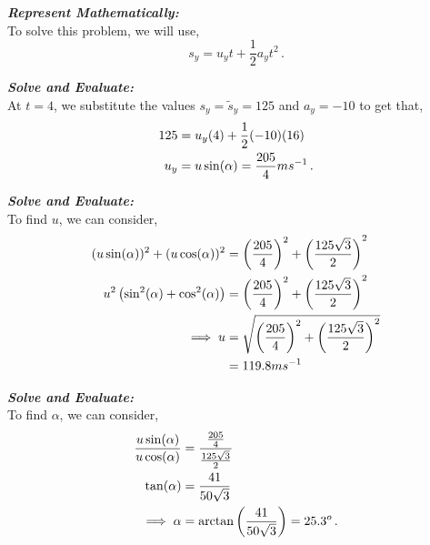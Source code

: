 \begin{subquestions}
\begin{subsubquestions}

\subsubquestion

\textbf{\textit{Represent Mathematically:}} \\
To solve this problem, we will use,
\begin{equation}
	s_y = u_yt + \frac{1}{2}a_yt^2 \,.
\end{equation}




\textbf{\textit{Solve and Evaluate:}} \\
At $t=4$, we substitute the values $s_y=\tilde{s}_y=125$ and $a_y=-10$ to get that,
\begin{align}
	125 & = u_y(4) + \frac{1}{2}(-10)(16) \nonumber \\
	u_y & = u\sin(\alpha) = \frac{205}{4}ms^{-1} \,.
\end{align}


\subsubquestion

\textbf{\textit{Solve and Evaluate:}} \\
To find $u$, we can consider,
\begin{align}
	(u\sin(\alpha))^2 + (u\cos(\alpha))^2 & = \left(\frac{205}{4}\right)^2 + \left(\frac{125\sqrt{3}}{2}\right)^2 \nonumber \\
	 u^2\left(\sin^2(\alpha)+\cos^2(\alpha)\right) & = \left(\frac{205}{4}\right)^2 + \left(\frac{125\sqrt{3}}{2}\right)^2 \nonumber \\
	 \implies u & = \sqrt{\left(\frac{205}{4}\right)^2 + \left(\frac{125\sqrt{3}}{2}\right)^2} \nonumber \\
	            & = 119.8ms^{-1}
\end{align}


\subsubquestion

\textbf{\textit{Solve and Evaluate:}} \\
To find $\alpha$, we can consider,
\begin{align}
	\frac{u\sin(\alpha)}{u\cos(\alpha)} & = \frac{\frac{205}{4}}{\frac{125\sqrt{3}}{2}} \nonumber \\
	\tan(\alpha) & = \frac{41}{50\sqrt{3}} \nonumber \\
	\implies \alpha & = \arctan\left(\frac{41}{50\sqrt{3}}\right) = 25.3^o \,.
\end{align}
	
\end{subsubquestions}

\end{subquestions}
	